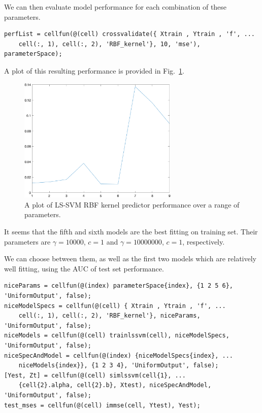 \documentclass[10pt,a4paper]{article}
\begin{document}
We can then evaluate model performance for each combination of these parameters.

\begin{lstlisting}[style=Matlab-editor]
perfList = cellfun(@(cell) crossvalidate({ Xtrain , Ytrain , 'f', ...
    cell(:, 1), cell(:, 2), 'RBF_kernel'}, 10, 'mse'), parameterSpace);
\end{lstlisting}

A plot of this resulting performance is provided in Fig.~\ref{fig:crossvalidatedRBFSinc}.

\begin{figure}[h!]
  \includegraphics[width=3in]{crossvalidatedRBFSinc.png}
  \caption{A plot of LS-SVM RBF kernel predictor performance over a range of parameters.}
  \label{fig:crossvalidatedRBFSinc}
\end{figure}

It seems that the fifth and sixth models are the best fitting on training set. Their parameters are $\gamma=10000$, $c=1$ and $\gamma=10000000$, $c=1$, respectively.

We can choose between them, as well as the first two models which are relatively well fitting, using the AUC of test set performance.

\begin{lstlisting}[style=Matlab-editor]
niceParams = cellfun(@(index) parameterSpace{index}, {1 2 5 6}, 'UniformOutput', false);
niceModelSpecs = cellfun(@(cell) { Xtrain , Ytrain , 'f', ...
    cell(:, 1), cell(:, 2), 'RBF_kernel'}, niceParams, 'UniformOutput', false);
niceModels = cellfun(@(cell) trainlssvm(cell), niceModelSpecs, 'UniformOutput', false);
niceSpecAndModel = cellfun(@(index) {niceModelSpecs{index}, ...
    niceModels{index}}, {1 2 3 4}, 'UniformOutput', false);
[Yest, Zt] = cellfun(@(cell) simlssvm(cell{1}, ...
    {cell{2}.alpha, cell{2}.b}, Xtest), niceSpecAndModel, 'UniformOutput', false);
test_mses = cellfun(@(cell) immse(cell, Ytest), Yest);
\end{lstlisting}
\end{document}
